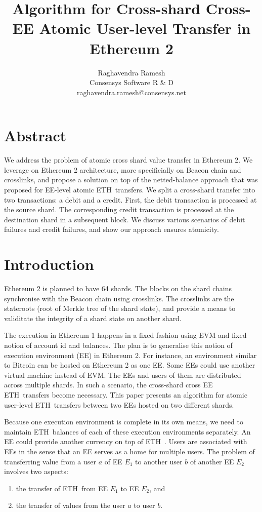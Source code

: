 \documentclass{article}
\title{Algorithm for Cross-shard Cross-EE Atomic User-level \eth Transfer in Ethereum 2}
\author{Raghavendra Ramesh\\Consensys Software R \& D\\raghavendra.ramesh@consensys.net}
\date{}
\newcommand{\eth}[0]{ETH~}
\begin{document}
\maketitle

\section*{Abstract}
We address the problem of atomic cross shard value transfer in Ethereum 2. We leverage on Ethereum 2 architecture, more specificially on Beacon chain and crosslinks, and propose a solution on top of the netted-balance approach that was proposed for EE-level atomic \eth transfers. We split a cross-shard transfer into two transactions: a debit and a credit. First, the debit transaction is processed at the source shard. The corresponding credit transaction is processed at the destination shard in a subsequent block. We discuss various scenarios of debit failures and credit failures, and show our approach ensures atomicity.

\section{Introduction}

Ethereum 2 is planned to have 64 shards. The blocks on the shard chains synchronise with the Beacon chain using crosslinks. The crosslinks are the stateroots (root of Merkle tree of the shard state), and provide a means to validitate the integrity of a shard state on another shard. 

The execution in Ethereum 1 happens in a fixed fashion using EVM and fixed notion of account id and balances. The plan is to generalise this notion of execution environment (EE) in Ethereum 2. For instance, an environment similar to Bitcoin can be hosted on Ethereum 2 as one EE.  Some EEs could use another virtual machine instead of EVM. The EEs and users of them are distributed across multiple shards. In such a scenario, the cross-shard cross EE \eth transfers become necessary. This paper presents an algorithm for atomic user-level \eth transfers between two EEs hosted on two different shards.

Because one execution environment is complete in its own means, we need to maintain \eth balances of each of these execution environments separately. An EE could provide another currency on top of \eth. Users are associated with EEs in the sense that an EE serves as a home for multiple users. The problem of transferring value from a user $a$ of EE $E_1$ to another user $b$ of another EE $E_2$ involves two aspects:
\begin{enumerate}
    \item the transfer of \eth from EE $E_1$ to EE $E_2$, and
    \item the transfer of values from the user $a$ to user $b$.
\end{enumerate}
\end{document}
